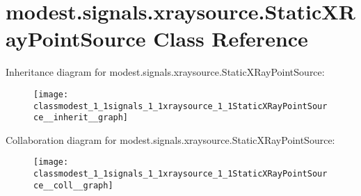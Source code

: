 \hypertarget{classmodest_1_1signals_1_1xraysource_1_1StaticXRayPointSource}{}\section{modest.\+signals.\+xraysource.\+Static\+X\+Ray\+Point\+Source Class Reference}
\label{classmodest_1_1signals_1_1xraysource_1_1StaticXRayPointSource}


Inheritance diagram for modest.\+signals.\+xraysource.\+Static\+X\+Ray\+Point\+Source\+:\nopagebreak
\begin{figure}[H]
\begin{center}
\leavevmode
\texttt{[image: classmodest\_1\_1signals\_1\_1xraysource\_1\_1StaticXRayPointSource\_\_inherit\_\_graph]}
\end{center}
\end{figure}


Collaboration diagram for modest.\+signals.\+xraysource.\+Static\+X\+Ray\+Point\+Source\+:\nopagebreak
\begin{figure}[H]
\begin{center}
\leavevmode
\texttt{[image: classmodest\_1\_1signals\_1\_1xraysource\_1\_1StaticXRayPointSource\_\_coll\_\_graph]}
\end{center}
\end{figure}
